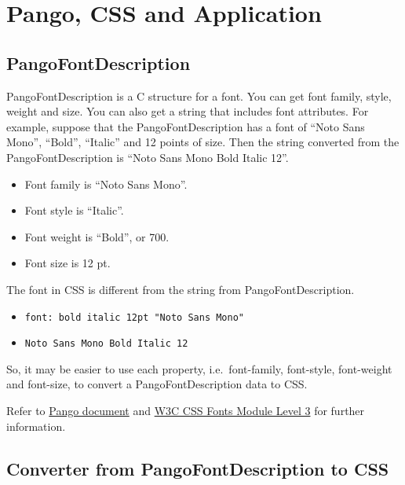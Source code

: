 \section{Pango, CSS and Application}\label{pango-css-and-application}

\subsection{PangoFontDescription}\label{pangofontdescription}

PangoFontDescription is a C structure for a font. You can get font
family, style, weight and size. You can also get a string that includes
font attributes. For example, suppose that the PangoFontDescription has
a font of ``Noto Sans Mono'', ``Bold'', ``Italic'' and 12 points of
size. Then the string converted from the PangoFontDescription is ``Noto
Sans Mono Bold Italic 12''.

\begin{itemize}
\tightlist
\item
  Font family is ``Noto Sans Mono''.
\item
  Font style is ``Italic''.
\item
  Font weight is ``Bold'', or 700.
\item
  Font size is 12 pt.
\end{itemize}

The font in CSS is different from the string from PangoFontDescription.

\begin{itemize}
\tightlist
\item
  \passthrough{\lstinline!font: bold italic 12pt "Noto Sans Mono"!}
\item
  \passthrough{\lstinline!Noto Sans Mono Bold Italic 12!}
\end{itemize}

So, it may be easier to use each property, i.e.~font-family, font-style,
font-weight and font-size, to convert a PangoFontDescription data to
CSS.

Refer to \href{https://docs.gtk.org/Pango/index.html}{Pango document}
and \href{https://www.w3.org/TR/css-fonts-3/}{W3C CSS Fonts Module Level
3} for further information.

\subsection{Converter from PangoFontDescription to
CSS}\label{converter-from-pangofontdescription-to-css}

